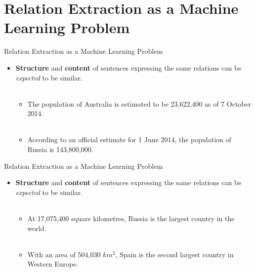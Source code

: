 \documentclass{beamer}
\begin{document}

\section{Relation Extraction as a Machine Learning Problem}

\begin{frame}{Relation Extraction as a Machine Learning Problem}
 \begin{itemize}
  \item \textbf{Structure} and \textbf{content} of sentences expressing the same relations can be \emph{expected} to be similar.  \\~\\
 \begin{itemize}
      \item The population of Australia is estimated to be 23,622,400 as of 7 October 2014. \\~\\
      \item According to an official estimate for 1 June 2014, the population of Russia is 143,800,000.   
   \end{itemize}
%  
 \end{itemize}
\end{frame}
\begin{frame}{Relation Extraction as a Machine Learning Problem}
\begin{itemize}
\item \textbf{Structure} and \textbf{content} of sentences expressing the same relations can be \emph{expected} to be similar.  \\~\\
 \begin{itemize}   
    \item At 17,075,400 square kilometres, Russia is the largest country in the world. \\~\\
    \item With an area of 504,030 $km^{2}$, Spain is the second largest country in Western Europe. 
    \end{itemize}
 \end{itemize}
\end{frame}
\end{document}
